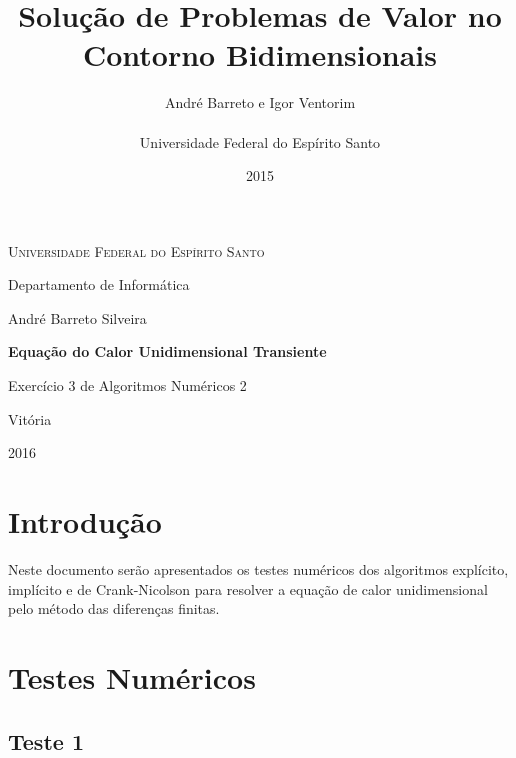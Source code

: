 \documentclass[
	11pt,				%
	oneside,			%
	a4paper,			%
	english,			%
	brazil,				%
	]{article}
\title{\textbf{Solução de Problemas de Valor no Contorno Bidimensionais}}
\author{
André Barreto e Igor Ventorim\\\\
\normalsize Universidade Federal do Espírito Santo\\
}
\date{2015}
\begin{document}


\frenchspacing

\graphicspath{ {Imagens/} }

\begin{titlepage}
	\centering
	{\scshape \large Universidade Federal do Espírito Santo\par}
	{\large Departamento de Informática\par}
	\vspace{1cm}
	{\large André Barreto Silveira\par}
	
	\vfill
	
	{\LARGE \bfseries Equação do Calor Unidimensional Transiente\par}
	\vspace{1cm}
	{\large Exercício 3 de Algoritmos Numéricos 2\par}

	\vfill

	{\large Vitória\par}
	{\large 2016\par}
\end{titlepage}
\addtocounter{page}{1}

\section{Introdução}
Neste documento serão apresentados os testes numéricos dos algoritmos 
explícito, implícito e de Crank-Nicolson para resolver a equação de calor 
unidimensional pelo método das diferenças finitas.

\section{Testes Numéricos}

\subsection{Teste 1}
\end{document}
